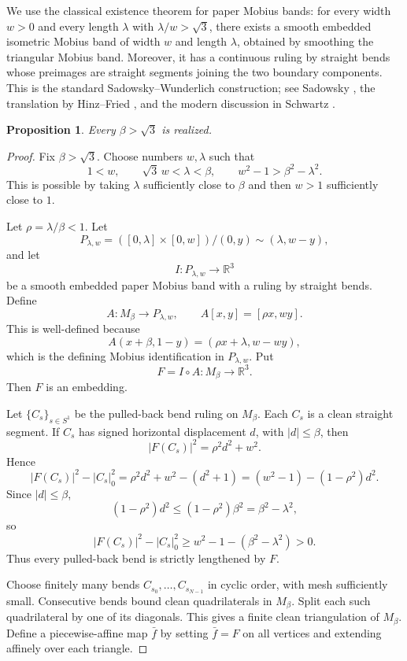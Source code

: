 \documentclass[11pt]{article}
\newtheorem{proposition}[theorem]{Proposition}
\newcommand{\R}{\mathbb R}
\begin{document}
We use the classical existence theorem for paper Mobius bands: for every width \(w>0\) and every length \(\lambda\) with \(\lambda/w>\sqrt3\), there exists a smooth embedded isometric Mobius band of width \(w\) and length \(\lambda\), obtained by smoothing the triangular Mobius band.  Moreover, it has a continuous ruling by straight bends whose preimages are straight segments joining the two boundary components.  This is the standard Sadowsky--Wunderlich construction; see Sadowsky \cite{Sadowsky}, the translation by Hinz--Fried \cite{HinzFried}, and the modern discussion in Schwartz \cite{Schwartz}.

\begin{proposition}
Every \(\beta>\sqrt3\) is realized.
\end{proposition}

\begin{proof}
Fix \(\beta>\sqrt3\).  Choose numbers \(w,\lambda\) such that
\[
1<w,\qquad \sqrt3\,w<\lambda<\beta,\qquad
w^2-1>\beta^2-\lambda^2.
\]
This is possible by taking \(\lambda\) sufficiently close to \(\beta\) and then \(w>1\) sufficiently close to \(1\).

Let \(\rho=\lambda/\beta<1\).  Let
\[
P_{\lambda,w}=([0,\lambda]\times[0,w])/(0,y)\sim(\lambda,w-y),
\]
and let
\[
I:P_{\lambda,w}\longrightarrow \R^3
\]
be a smooth embedded paper Mobius band with a ruling by straight bends.  Define
\[
A:M_\beta\longrightarrow P_{\lambda,w},\qquad A[x,y]=[\rho x,wy].
\]
This is well-defined because
\[
A(x+\beta,1-y)=(\rho x+\lambda,w-wy),
\]
which is the defining Mobius identification in \(P_{\lambda,w}\).  Put
\[
F=I\circ A:M_\beta\longrightarrow \R^3.
\]
Then \(F\) is an embedding.

Let \(\{C_s\}_{s\in S^1}\) be the pulled-back bend ruling on \(M_\beta\).  Each \(C_s\) is a clean straight segment.  If \(C_s\) has signed horizontal displacement \(d\), with \(|d|\le \beta\), then
\[
|F(C_s)|^2=\rho^2d^2+w^2.
\]
Hence
\[
|F(C_s)|^2-|C_s|_0^2
=\rho^2d^2+w^2-(d^2+1)
=(w^2-1)-(1-\rho^2)d^2.
\]
Since \(|d|\le\beta\),
\[
(1-\rho^2)d^2\le (1-\rho^2)\beta^2=\beta^2-\lambda^2,
\]
so
\[
|F(C_s)|^2-|C_s|_0^2\ge w^2-1-(\beta^2-\lambda^2)>0. \tag{3}
\]
Thus every pulled-back bend is strictly lengthened by \(F\).

Choose finitely many bends \(C_{s_0},\dots,C_{s_{N-1}}\) in cyclic order, with mesh sufficiently small.  Consecutive bends bound clean quadrilaterals in \(M_\beta\).  Split each such quadrilateral by one of its diagonals.  This gives a finite clean triangulation of \(M_\beta\).  Define a piecewise-affine map \(\bar f\) by setting \(\bar f=F\) on all vertices and extending affinely over each triangle.


\end{proof}
\end{document}
